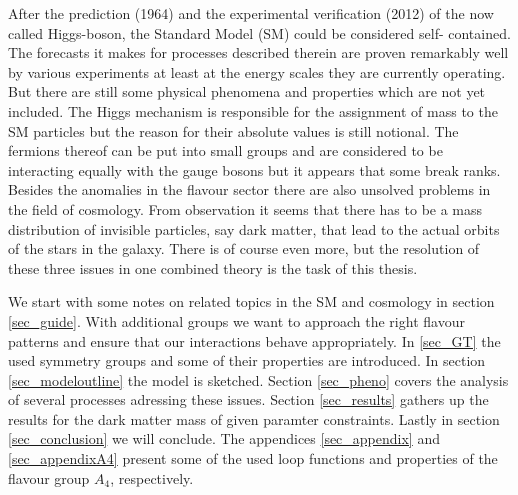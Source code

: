After the prediction (1964) and the experimental verification (2012) of the
now called Higgs-boson, the Standard Model (SM) could be considered self-
contained. The forecasts it makes for processes described therein are proven
remarkably well by various experiments at least at the energy scales they
are currently operating. But there are still some physical phenomena and
properties which are not yet included. The Higgs mechanism is responsible
for the assignment of mass to the SM particles but the reason for their
absolute values is still notional. The fermions thereof can be put into
small groups and are considered to be interacting equally with the gauge bosons but it appears
that some break ranks. Besides the anomalies in the flavour sector there are also unsolved problems
in the field of cosmology. From observation it seems that there has to be a mass distribution of
invisible particles, say dark matter, that lead to the actual orbits of the stars in the galaxy.
There is of course even more, but the resolution of these three issues in one combined theory is
the task of this thesis.

\noindent We start with some notes on 
related topics in the SM and cosmology in section \ref{sec_guide}. With additional groups we want
to approach the right flavour patterns and ensure that our interactions behave appropriately. In \ref{sec_GT} the used symmetry groups and some of 
their properties are introduced. In section \ref{sec_modeloutline} the model
is sketched. Section \ref{sec_pheno} covers the analysis of several processes adressing these issues. 
Section \ref{sec_results} gathers up the results for the dark matter mass of given paramter constraints.
Lastly in section \ref{sec_conclusion} we will conclude. The appendices \ref{sec_appendix} and \ref{sec_appendixA4} present some of
the used loop functions and properties of the flavour group $A_4$, respectively.
